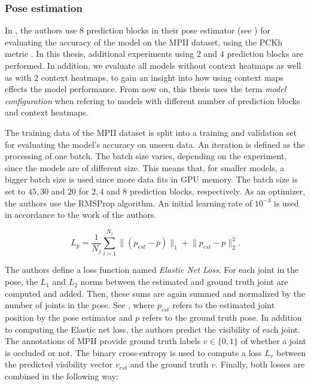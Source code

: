 \subsubsection{Pose estimation}
\label{sec:exp-mpii-pose}
In \cite{luvizon_2d/3d_2018}, the authors use $8$ prediction blocks in their pose estimator (see ) for evaluating the accuracy of the model on the MPII dataset, using the PCKh metric .
In this thesis, additional experiments using $2$ and $4$ prediction blocks are performed.
In addition, we evaluate all models without context heatmaps as well as with $2$ context heatmaps, to gain an insight into how using context maps effects the model performance.
From now on, this thesis uses the term \textit{model configuration} when refering to models with different number of prediction blocks and context heatmaps.

The training data of the MPII dataset is split into a training and validation set for evaluating the model's accuracy on unseen data.
An iteration is defined as the processing of one batch.
The batch size varies, depending on the experiment, since the models are of different size.
This means that, for smaller models, a bigger batch size is used since more data fits in GPU memory.
The batch size is set to $45, 30$ and $20$ for $2, 4$ and $8$ prediction blocks, respectively.
As an optimizer, the authors use the RMSProp algorithm.
An initial learning rate of $10^{-3}$ is used in accordance to the work of the authors.

\begin{equation}
    \label{eq:elasticnetloss}
    L_p = \frac{1}{N_j} \sum_{i=1}^{N_j} \lVert(p_{est} - p)\rVert_1 + \lVert p_{est} - p \rVert^2_2.
\end{equation}

The authors define a loss function named \textit{Elastic Net Loss}.
For each joint in the pose, the $L_1$ and $L_2$ norms between the estimated and ground truth joint are computed and added.
Then, these sums are again summed and normalized by the number of joints in the pose.
See , where $p_{est}$ refers to the estimated joint position by the pose estimator and $p$ refers to the ground truth pose.
In addition to computing the Elastic net loss, the authors predict the visibility of each joint.
The annotations of MPII provide ground truth labels $v \in \{0,1\}$ of whether a joint is occluded or not.
The binary cross-entropy is used to compute a loss $L_v$ between the predicted visibility vector $v_{est}$ and the ground truth $v$.
Finally, both losses are combined in the following way:

